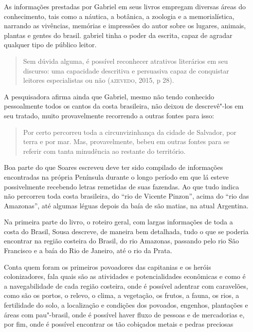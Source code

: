 \documentclass[12pt]{extarticle}
\begin{document}
As informações prestadas por Gabriel em seus livros empregam diversas
áreas do conhecimento, tais como a náutica, a botânica, a zoologia e a
memorialística, narrando as vivências, memórias e impressões do autor
sobre os lugares, animais, plantas e gentes do brasil. gabriel tinha o
poder da escrita, capaz de agradar qualquer tipo de público leitor.

\begin{quote}
Sem dúvida alguma, é possível reconhecer atrativos literários em seu
discurso: uma capacidade descritiva e persuasiva capaz de conquistar
leitores especialistas ou não (\textsc{azevedo}, 2015, p 28).
\end{quote}

A pesquisadora afirma ainda que Gabriel, mesmo não tendo conhecido
pessoalmente todos os cantos da costa brasileira, não deixou de
descrevê"-los em seu tratado, muito provavelmente recorrendo a outras
fontes para isso:

\begin{quote}
Por certo percorreu toda a circunvizinhança da cidade de Salvador, por
terra e por mar. Mas, provavelmente, bebeu em outras fontes para se
referir com tanta minudência ao restante do território.
\end{quote}


Boa parte do que Soares escreveu deve ter sido compilado de informações
encontradas na própria Península durante o longo período em que lá
esteve possivelmente recebendo letras remetidas de suas fazendas. Ao que
tudo indica não percorreu toda costa brasileira, do ``rio de Vicente
Pinzon'', acima do ``rio das Amazonas'', até algumas léguas depois da
baía de são matias, na atual Argentina.

Na primeira parte do livro, o roteiro geral, com largas informações de
toda a costa do Brasil, Sousa descreve, de maneira bem detalhada, tudo o
que se poderia encontrar na região costeira do Brasil, do rio Amazonas,
passando pelo rio São Francisco e a baía do Rio de Janeiro, até o rio da
Prata.

Conta quem foram os primeiros povoadores das capitanias e os heróis
colonizadores, fala quais são as atividades e potencialidades econômicas
e como é a navegabilidade de cada região costeira, onde é possível
adentrar com caravelões, como são os portos, o relevo, o clima, a
vegetação, os frutos, a fauna, os rios, a fertilidade do solo, a
localização e condições dos povoados, engenhos, plantações e áreas com
pau"-brasil, onde é possível haver fluxo de pessoas e de mercadorias e,
por fim, onde é possível encontrar os tão cobiçados metais e pedras
preciosas
\end{document}
